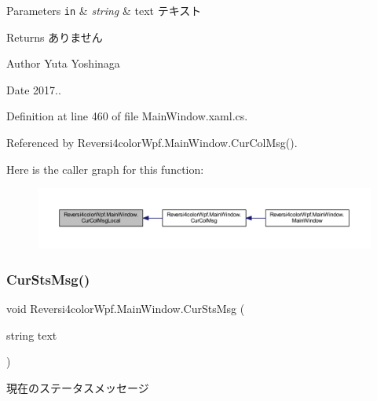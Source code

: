 \begin{DoxyParams}[1]{Parameters}
\mbox{\tt in}  & {\em string} & text テキスト \\
\hline
\end{DoxyParams}
\begin{DoxyReturn}{Returns}
ありません 
\end{DoxyReturn}
\begin{DoxyAuthor}{Author}
Yuta Yoshinaga 
\end{DoxyAuthor}
\begin{DoxyDate}{Date}
2017.. 
\end{DoxyDate}


Definition at line 460 of file Main\+Window.\+xaml.\+cs.



Referenced by Reversi4color\+Wpf.\+Main\+Window.\+Cur\+Col\+Msg().

Here is the caller graph for this function\+:
\nopagebreak
\begin{figure}[H]
\begin{center}
\leavevmode
\includegraphics[width=350pt]{class_reversi4color_wpf_1_1_main_window_a95f83a9cd4af4893c6fe2b84d717b92c_icgraph}
\end{center}
\end{figure}
\mbox{\label{class_reversi4color_wpf_1_1_main_window_a5aacc83414f6c239899ee02e2ee8d9df}} 
\subsubsection{\texorpdfstring{Cur\+Sts\+Msg()}{CurStsMsg()}}
{\footnotesize\ttfamily void Reversi4color\+Wpf.\+Main\+Window.\+Cur\+Sts\+Msg (\begin{DoxyParamCaption}\item[{string}]{text }\end{DoxyParamCaption})}



現在のステータスメッセージ 


